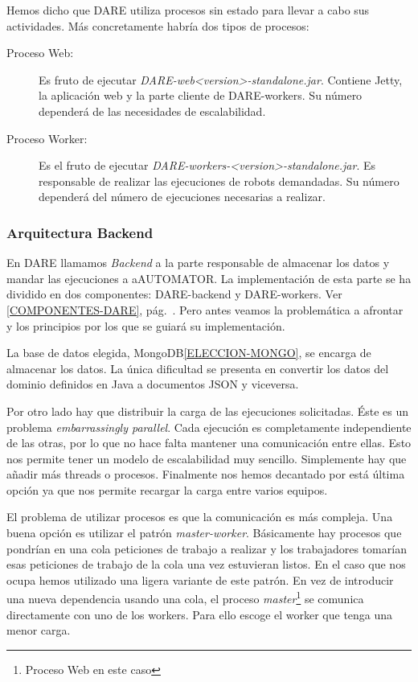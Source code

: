 Hemos dicho que DARE utiliza procesos sin estado para llevar a cabo
sus actividades. Más concretamente habría dos tipos de procesos:
\begin{description}
  \item[Proceso Web:] Es fruto de ejecutar
    \emph{DARE-web<version>-standalone.jar}. Contiene Jetty, la
    aplicación web y la parte cliente de DARE-workers. Su número
    dependerá de las necesidades de escalabilidad.
  \item[Proceso Worker:] Es el fruto de ejecutar
    \emph{DARE-workers-<version>-standalone.jar}. Es responsable de
    realizar las ejecuciones de robots demandadas. Su número dependerá
    del número de ejecuciones necesarias a realizar.
\end{description}

\subsubsection{Arquitectura Backend}

En DARE llamamos \emph{Backend} a la parte responsable de almacenar
los datos y mandar las ejecuciones a aAUTOMATOR. La implementación de
esta parte se ha dividido en dos componentes: DARE-backend y
DARE-workers. Ver \ref{COMPONENTES-DARE},
pág.~\pageref{COMPONENTES-DARE}. Pero antes veamos la problemática a
afrontar y los principios por los que se guiará su implementación.

La base de datos elegida, MongoDB\ref{ELECCION-MONGO}, se encarga de
almacenar los datos. La única dificultad se presenta en convertir los
datos del dominio definidos en Java a documentos JSON y viceversa.

Por otro lado hay que distribuir la carga de las ejecuciones
solicitadas. Éste es un problema \emph{embarrassingly
  parallel}\cite{EMBARRASSINGLY-PARALLEL}. Cada ejecución es
completamente independiente de las otras, por lo que no hace falta
mantener una comunicación entre ellas. Esto nos permite tener un
modelo de escalabilidad muy sencillo. Simplemente hay que añadir más
threads o procesos. Finalmente nos hemos decantado por está última
opción ya que nos permite recargar la carga entre varios equipos.

El problema de utilizar procesos es que la comunicación es más
compleja. Una buena opción es utilizar el patrón
\emph{master-worker}\cite{MASTER-WORKER}. Básicamente hay procesos que
pondrían en una cola peticiones de trabajo a realizar y los
trabajadores tomarían esas peticiones de trabajo de la cola una vez
estuvieran listos. En el caso que nos ocupa hemos utilizado una ligera
variante de este patrón. En vez de introducir una nueva dependencia
usando una cola, el proceso \emph{master}\footnote{Proceso Web en este
  caso} se comunica directamente con uno de los workers. Para ello
escoge el worker que tenga una menor carga.

